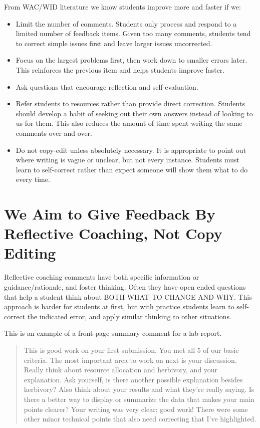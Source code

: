 \documentclass[
]{book}
\providecommand{\tightlist}{%
  \setlength{\itemsep}{0pt}\setlength{\parskip}{0pt}}
\begin{document}
From WAC/WID literature we know students improve more and faster if we:

\begin{itemize}
\tightlist
\item
  Limit the number of comments. Students only process and respond to a limited number of feedback items. Given too many comments, students tend to correct simple issues first and leave larger issues uncorrected.
\item
  Focus on the largest problems first, then work down to smaller errors later. This reinforces the previous item and helps students improve faster.
\item
  Ask questions that encourage reflection and self-evaluation.
\item
  Refer students to resources rather than provide direct correction. Students should develop a habit of seeking out their own answers instead of looking to us for them. This also reduces the amount of time spent writing the same comments over and over.
\item
  Do not copy-edit unless absolutely necessary. It is appropriate to point out where writing is vague or unclear, but not every instance. Students must learn to self-correct rather than expect someone will show them what to do every time.
\end{itemize}

\hypertarget{we-aim-to-give-feedback-by-reflective-coaching-not-copy-editing}{%
\section{We Aim to Give Feedback By Reflective Coaching, Not Copy Editing}\label{we-aim-to-give-feedback-by-reflective-coaching-not-copy-editing}}

Reflective coaching comments have both specific information or guidance/rationale, and foster thinking. Often they have open ended questions that help a student think about BOTH WHAT TO CHANGE AND WHY. This approach is harder for students at first, but with practice students learn to self-correct the indicated error, and apply similar thinking to other situations.

This is an example of a front-page summary comment for a lab report.

\begin{quote}
This is good work on your first submission. You met all 5 of our basic criteria. The most important area to work on next is your discussion. Really think about resource allocation and herbivory, and your explanation. Ask yourself, is there another possible explanation besides herbivory? Also think about your results and what they're really saying. Is there a better way to display or summarize the data that makes your main points clearer? Your writing was very clear; good work! There were some other minor technical points that also need correcting that I've highlighted.
\end{quote}
\end{document}
